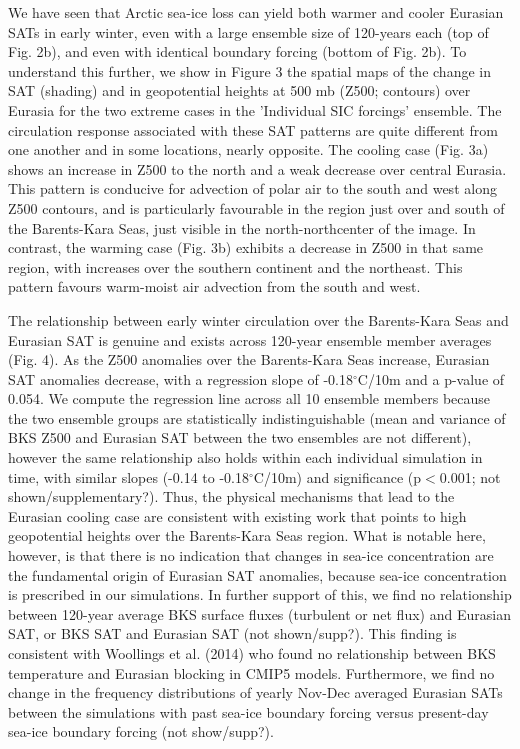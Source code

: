 \documentclass[grl]{AGUTeX}  %
\begin{document}
\begin{article}
We have seen that Arctic sea-ice loss can yield both warmer and cooler Eurasian SATs in early winter, even with a large ensemble size of 120-years each (top of Fig. 2b), and even with identical boundary forcing (bottom of Fig. 2b). To understand this further, we show in Figure 3 the spatial maps of the change in SAT (shading) and in geopotential heights at 500 mb (Z500; contours) over Eurasia for the two extreme cases in the 'Individual SIC forcings' ensemble. The circulation response associated with these SAT patterns are quite different from one another and in some locations, nearly opposite. The cooling case (Fig. 3a) shows an increase in Z500 to the north and a weak decrease over central Eurasia. This pattern is conducive for advection of polar air to the south and west along Z500 contours, and is particularly favourable in the region just over and south of the Barents-Kara Seas, just visible in the north-northcenter of the image. In contrast, the warming case (Fig. 3b) exhibits a decrease in Z500 in that same region, with increases over the southern continent and the northeast. This pattern favours warm-moist air advection from the south and west.

The relationship between early winter circulation over the Barents-Kara Seas and Eurasian SAT is genuine and exists across 120-year ensemble member averages (Fig. 4). As the Z500 anomalies over the Barents-Kara Seas increase, Eurasian SAT anomalies decrease, with a regression slope of -0.18$^\circ$C/10m and a p-value of 0.054. We compute the regression line across all 10 ensemble members because the two ensemble groups are statistically indistinguishable (mean and variance of BKS Z500 and Eurasian SAT between the two ensembles are not different), however the same relationship also holds within each individual simulation in time, with similar slopes (-0.14 to -0.18$^\circ$C/10m) and significance (p$<$0.001; not shown/supplementary?). Thus, the physical mechanisms that lead to the Eurasian cooling case are consistent with existing work that points to high geopotential heights over the Barents-Kara Seas region. What is notable here, however, is that there is no indication that changes in sea-ice concentration are the fundamental origin of Eurasian SAT anomalies, because sea-ice concentration is prescribed in our simulations. In further support of this, we find no relationship between 120-year average BKS surface fluxes (turbulent or net flux) and Eurasian SAT, or BKS SAT and Eurasian SAT (not shown/supp?). This finding is consistent with Woollings et al. (2014) who found no relationship between BKS temperature and Eurasian blocking in CMIP5 models. Furthermore, we find no change in the frequency distributions of yearly Nov-Dec averaged Eurasian SATs between the simulations with past sea-ice boundary forcing versus present-day sea-ice boundary forcing (not show/supp?).


\end{article}
\end{document}
